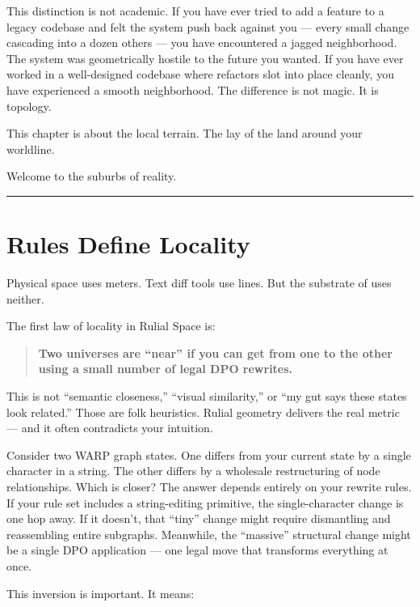 This distinction is not academic. If you have ever tried to add a feature to a legacy codebase and felt the system push back against you --- every small change cascading into a dozen others --- you have encountered a jagged neighborhood. The system was geometrically hostile to the future you wanted. If you have ever worked in a well-designed codebase where refactors slot into place cleanly, you have experienced a smooth neighborhood. The difference is not magic. It is topology.

This chapter is about the local terrain. The lay of the land around your worldline.

Welcome to the suburbs of reality.

\begin{center}\rule{0.5\linewidth}{0.5pt}\end{center}

\section{Rules Define Locality}
\label{7.1-rules-define-locality}

Physical space uses meters. Text diff tools use lines. But the substrate of \COMPUTER{} uses neither.

The first law of locality in Rulial Space is:

\begin{quote}
\textbf{Two universes are ``near'' if you can get from one to the other using a small number of legal DPO rewrites.}
\end{quote}

This is not ``semantic closeness,'' ``visual similarity,'' or ``my gut says these states look related.'' Those are folk heuristics. Rulial geometry delivers the real metric --- and it often contradicts your intuition.

Consider two WARP graph states. One differs from your current state by a single character in a string. The other differs by a wholesale restructuring of node relationships. Which is closer? The answer depends entirely on your rewrite rules. If your rule set includes a string-editing primitive, the single-character change is one hop away. If it doesn't, that ``tiny'' change might require dismantling and reassembling entire subgraphs. Meanwhile, the ``massive'' structural change might be a single DPO application --- one legal move that transforms everything at once.

This inversion is important. It means:

